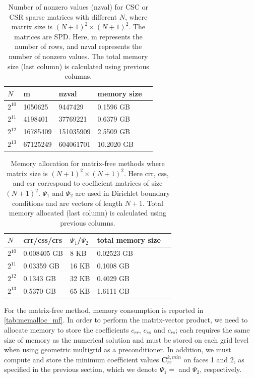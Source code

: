 \begin{table}[t]
\small\sf\centering
\begin{center}
\begin{tabular}{l l l l l }
\toprule
$N$  & m & nzval & memory size \\
\midrule
$2^{10}$& 1050625  & 9447429 & 0.1596 GB \\
$2^{11}$ & 4198401 & 37769221& 0.6379 GB &  \\
$2^{12}$ & 16785409   & 151035909   & 2.5509 GB &  \\
$2^{13}$ & 67125249   & 604061701   & 10.2020 GB & \\
\bottomrule
\end{tabular}
\end{center}
\caption{Number of nonzero values (nzval) for CSC or CSR sparse matrices with different $N$, where matrix size is $(N+1)^2 \times (N+1)^2$. The matrices are SPD. Here, m represents the number of rows, and nzval represents the number of nonzero values. The total memory size (last column) is calculated using previous columns.
}
\label{tab:memalloc_comparison}
\end{table}


\begin{table}[t!]
\small\sf\centering
\begin{center}
\begin{tabular}{l l l l l }
\toprule
$N$  & crr/css/crs & $\Psi_1$/$\Psi_2$ & total memory size \\
\midrule
$2^{10}$& 0.008405 GB  & 8 KB & 0.02523 GB \\
$2^{11}$ & 0.03359 GB & 16 KB &  0.1008 GB \\
$2^{12}$ & 0.1343 GB  & 32 KB  & 0.4029 GB &  \\
$2^{13}$ & 0.5370 GB   & 65 KB   & 1.6111 GB & \\
\bottomrule
\end{tabular}
\end{center}
\caption{Memory allocation for matrix-free methods where matrix size is $(N+1)^2 \times (N+1)^2$. Here $\mathrm{crr}$, $\mathrm{css}$, and $\mathrm{csr}$ correspond to coefficient matrices of size $(N+1)^2$. $\Psi_1$ and $\Psi_2$ are used in Dirichlet boundary conditions and are vectors of length $N+1$. Total memory allocated (last column) is calculated using previous columns.
}
\label{tab:memalloc_mf}
\end{table}

For the matrix-free method, memory consumption is reported in \autoref{tab:memalloc_mf}. 
In order to perform the matrix-vector product, we need to allocate memory to store the coefficients $c_{rr}$, $c_{ss}$ and $c_{rs}$; each requires the same size of memory as the numerical solution and must be stored on each grid level when using geometric multigrid as a preconditioner. 
In addition, we must compute and store the minimum coefficient values ${\boldsymbol{C}}_{rr}^{k, min}$ on faces 1 and 2, as specified in the previous section, which we denote $\Psi_1 = $ and $\Psi_2$, respectively. 


